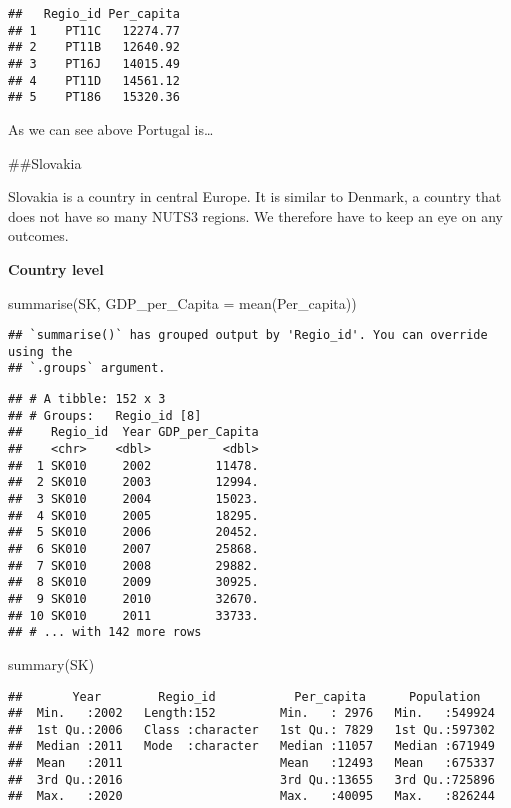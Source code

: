 \documentclass[
]{article}
\newenvironment{Shaded}{\begin{snugshade}}{\end{snugshade}}
\newcommand{\AttributeTok}[1]{\textcolor[rgb]{0.77,0.63,0.00}{#1}}
\newcommand{\FunctionTok}[1]{\textcolor[rgb]{0.00,0.00,0.00}{#1}}
\newcommand{\NormalTok}[1]{#1}
\begin{document}
\begin{verbatim}
##   Regio_id Per_capita
## 1    PT11C   12274.77
## 2    PT11B   12640.92
## 3    PT16J   14015.49
## 4    PT11D   14561.12
## 5    PT186   15320.36
\end{verbatim}

As we can see above Portugal is\ldots{}

\#\#Slovakia

Slovakia is a country in central Europe. It is similar to Denmark, a
country that does not have so many NUTS3 regions. We therefore have to
keep an eye on any outcomes.

\textbf{Country level}

\begin{Shaded}
\begin{Highlighting}[]
    \FunctionTok{summarise}\NormalTok{(SK, }\AttributeTok{GDP\_per\_Capita =} \FunctionTok{mean}\NormalTok{(Per\_capita))}
\end{Highlighting}
\end{Shaded}

\begin{verbatim}
## `summarise()` has grouped output by 'Regio_id'. You can override using the
## `.groups` argument.
\end{verbatim}

\begin{verbatim}
## # A tibble: 152 x 3
## # Groups:   Regio_id [8]
##    Regio_id  Year GDP_per_Capita
##    <chr>    <dbl>          <dbl>
##  1 SK010     2002         11478.
##  2 SK010     2003         12994.
##  3 SK010     2004         15023.
##  4 SK010     2005         18295.
##  5 SK010     2006         20452.
##  6 SK010     2007         25868.
##  7 SK010     2008         29882.
##  8 SK010     2009         30925.
##  9 SK010     2010         32670.
## 10 SK010     2011         33733.
## # ... with 142 more rows
\end{verbatim}

\begin{Shaded}
\begin{Highlighting}[]
\FunctionTok{summary}\NormalTok{(SK)}
\end{Highlighting}
\end{Shaded}

\begin{verbatim}
##       Year        Regio_id           Per_capita      Population    
##  Min.   :2002   Length:152         Min.   : 2976   Min.   :549924  
##  1st Qu.:2006   Class :character   1st Qu.: 7829   1st Qu.:597302  
##  Median :2011   Mode  :character   Median :11057   Median :671949  
##  Mean   :2011                      Mean   :12493   Mean   :675337  
##  3rd Qu.:2016                      3rd Qu.:13655   3rd Qu.:725896  
##  Max.   :2020                      Max.   :40095   Max.   :826244
\end{verbatim}
\end{document}
